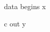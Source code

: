 \documentclass{article}
\begin{document}
\begin{algorithmic}[1]
\Require data
 begins
\State x
\item[{a]b}] c
\Ensure out
\State y
\end{algorithmic}
\end{document}
